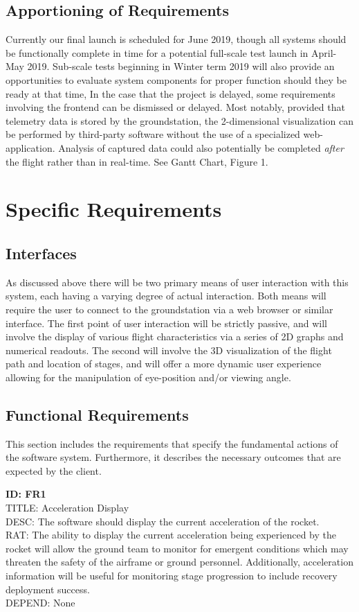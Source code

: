 \documentclass[onecolumn, draftclsnofoot,10pt, compsoc]{IEEEtran}
\begin{document}
		\subsection{Apportioning of Requirements}
			Currently our final launch is scheduled for June 2019, though all systems should be functionally complete in time for a potential full-scale test launch in April-May 2019.
			Sub-scale tests beginning in Winter term 2019 will also provide an opportunities to evaluate system components for proper function should they be ready at that time,
			In the case that the project is delayed, some requirements involving the frontend can be dismissed or delayed. Most notably, provided that telemetry data is stored by the groundstation, the 2-dimensional visualization can be performed by third-party software without the use of a specialized web-application.
			Analysis of captured data could also potentially be completed \textit{after} the flight rather than in real-time.
			See Gantt Chart, Figure 1.

	\newpage
	\section{Specific Requirements}
		\subsection{Interfaces}
			As discussed above there will be two primary means of user interaction with this system, each having a varying degree of actual interaction.
			Both means will require the user to connect to the groundstation via a web browser or similar interface.
			The first point of user interaction will be strictly passive, and will involve the display of various flight characteristics via a series of 2D graphs and numerical readouts.
			The second will involve the 3D visualization of the flight path and location of stages, and will offer a more dynamic user experience allowing for the manipulation of eye-position and/or viewing angle.

		\subsection{Functional Requirements}
			This section includes the requirements that specify the fundamental actions of the software system. Furthermore, it describes the necessary outcomes that are expected by the client.

			\noindent
			\textbf{ID: FR1}\\
			TITLE: Acceleration Display\\
			DESC: The software should display the current acceleration of the rocket.\\
			RAT: The ability to display the current acceleration being experienced by the rocket will allow the ground team to monitor for emergent conditions which may threaten the safety of the airframe or ground personnel.
				Additionally, acceleration information will be useful for monitoring stage progression to include recovery deployment success.\\
			DEPEND: None
			
\end{document}
